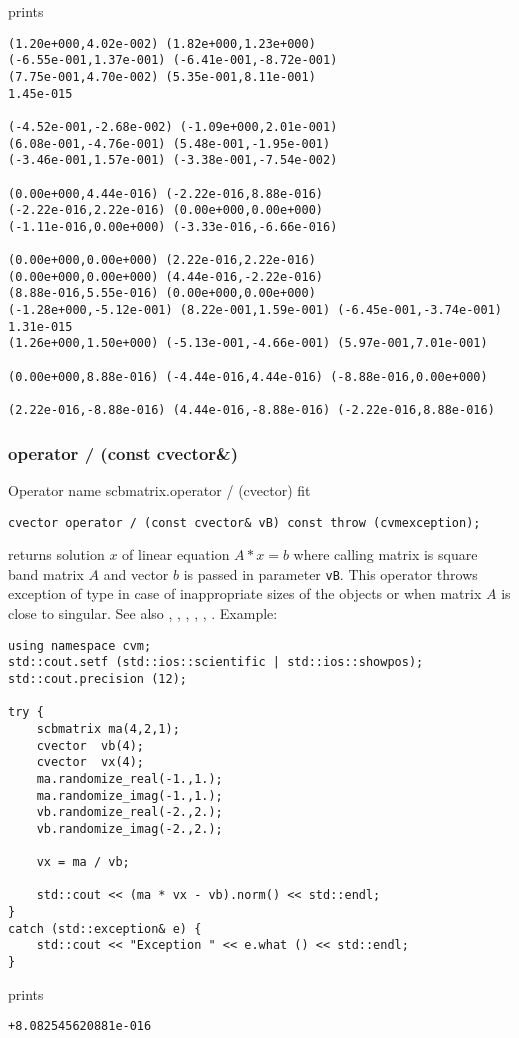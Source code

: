 prints
\begin{Verbatim}
(1.20e+000,4.02e-002) (1.82e+000,1.23e+000)
(-6.55e-001,1.37e-001) (-6.41e-001,-8.72e-001)
(7.75e-001,4.70e-002) (5.35e-001,8.11e-001)
1.45e-015

(-4.52e-001,-2.68e-002) (-1.09e+000,2.01e-001)
(6.08e-001,-4.76e-001) (5.48e-001,-1.95e-001)
(-3.46e-001,1.57e-001) (-3.38e-001,-7.54e-002)

(0.00e+000,4.44e-016) (-2.22e-016,8.88e-016)
(-2.22e-016,2.22e-016) (0.00e+000,0.00e+000)
(-1.11e-016,0.00e+000) (-3.33e-016,-6.66e-016)

(0.00e+000,0.00e+000) (2.22e-016,2.22e-016)
(0.00e+000,0.00e+000) (4.44e-016,-2.22e-016)
(8.88e-016,5.55e-016) (0.00e+000,0.00e+000)
(-1.28e+000,-5.12e-001) (8.22e-001,1.59e-001) (-6.45e-001,-3.74e-001)
1.31e-015
(1.26e+000,1.50e+000) (-5.13e-001,-4.66e-001) (5.97e-001,7.01e-001)

(0.00e+000,8.88e-016) (-4.44e-016,4.44e-016) (-8.88e-016,0.00e+000)

(2.22e-016,-8.88e-016) (4.44e-016,-8.88e-016) (-2.22e-016,8.88e-016)
\end{Verbatim}
\newpage




\subsubsection{operator / (const cvector\&)}
Operator%
\pdfdest name {scbmatrix.operator / (cvector)} fit
\begin{verbatim}
cvector operator / (const cvector& vB) const throw (cvmexception);
\end{verbatim}
returns solution $x$ of linear equation
$A*x=b$ where calling matrix is square band matrix $A$
and vector $b$ is passed in parameter \verb"vB".
This operator throws exception 
of type 
in case of inappropriate sizes
of the objects or when  matrix $A$ is close to singular.
See also , 
, 
, 
, , .
Example:
\begin{Verbatim}
using namespace cvm;
std::cout.setf (std::ios::scientific | std::ios::showpos);
std::cout.precision (12);

try {
    scbmatrix ma(4,2,1);
    cvector  vb(4);
    cvector  vx(4);
    ma.randomize_real(-1.,1.);
    ma.randomize_imag(-1.,1.);
    vb.randomize_real(-2.,2.);
    vb.randomize_imag(-2.,2.);

    vx = ma / vb;

    std::cout << (ma * vx - vb).norm() << std::endl;
}
catch (std::exception& e) {
    std::cout << "Exception " << e.what () << std::endl;
}
\end{Verbatim}
prints
\begin{Verbatim}
+8.082545620881e-016
\end{Verbatim}
\newpage






